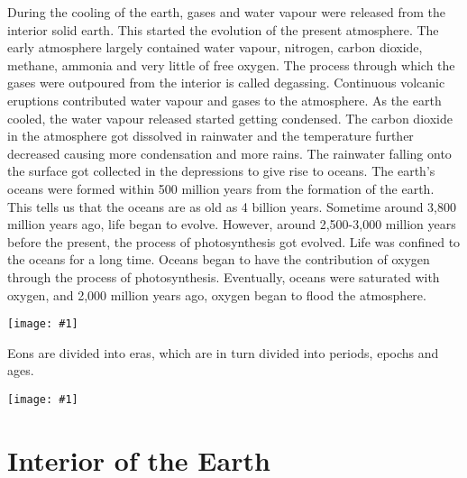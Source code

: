 \documentclass[8pt, a4paper, oneside, twocolumn]{extarticle}
\newcommand{\ph}[1]{
    \texttt{[image: \#1]}
}
\begin{document}
During the cooling of the earth, gases and water vapour were released from the interior solid earth. This started the evolution of the present atmosphere. The early atmosphere largely contained water vapour, nitrogen, carbon dioxide, methane, ammonia and very little of free oxygen. The process through which the gases were outpoured from the interior is called degassing. Continuous volcanic eruptions contributed water vapour and gases to the atmosphere. As the earth cooled, the water vapour released started getting condensed. The carbon dioxide in the atmosphere got dissolved in rainwater and the temperature further decreased causing more condensation and more rains. The rainwater falling onto the surface got collected in the depressions to give rise to oceans. The earth’s oceans were formed within 500 million years from the formation of the earth. This tells us that the oceans are as old as 4 billion years. Sometime around 3,800 million years ago, life began to evolve. However, around 2,500-3,000 million years before the present, the process of photosynthesis got evolved. Life was confined to the oceans for a long time. Oceans began to have the contribution of oxygen through the process of photosynthesis. Eventually, oceans were saturated with oxygen, and 2,000 million years ago, oxygen began to flood the atmosphere.

\ph{gts}

Eons are divided into eras, which are in turn divided into periods, epochs and ages.

\ph{ss}

\section{Interior of the Earth}
\end{document}

